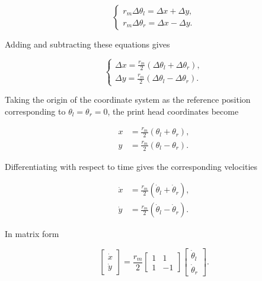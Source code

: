 \documentclass[a4paper,12pt]{article}
\begin{document}
\begin{equation}
\begin{cases}
r_m\Delta\theta_l = \Delta x + \Delta y,\\
r_m\Delta\theta_r = \Delta x - \Delta y.
\end{cases}
\end{equation}

Adding and subtracting these equations gives

\begin{equation}
\begin{cases}
\displaystyle \Delta x = \frac{r_m}{2}
(\Delta\theta_l+\Delta\theta_r),\\[6pt]
\displaystyle \Delta y = \frac{r_m}{2}
(\Delta\theta_l-\Delta\theta_r).
\end{cases}
\end{equation}

Taking the origin of the coordinate system as the reference position corresponding to $\theta_l=\theta_r=0$, the print head coordinates become

\begin{equation}
\boxed{
\begin{aligned}
x &= \frac{r_m}{2}(\theta_l+\theta_r),\\
y &= \frac{r_m}{2}(\theta_l-\theta_r).
\end{aligned}
}
\end{equation}

Differentiating with respect to time gives the corresponding velocities

\begin{equation}
\boxed{
\begin{aligned}
\dot{x} &= \frac{r_m}{2}
(\dot{\theta}_l+\dot{\theta}_r),\\
\dot{y} &= \frac{r_m}{2}
(\dot{\theta}_l-\dot{\theta}_r).
\end{aligned}
}
\end{equation}

In matrix form

\begin{equation}
\begin{bmatrix}
\dot{x}\\
\dot{y}
\end{bmatrix}
=
\frac{r_m}{2}
\begin{bmatrix}
1 & 1\\
1 & -1
\end{bmatrix}
\begin{bmatrix}
\dot{\theta}_l\\
\dot{\theta}_r
\end{bmatrix}.
\end{equation}
\end{document}
